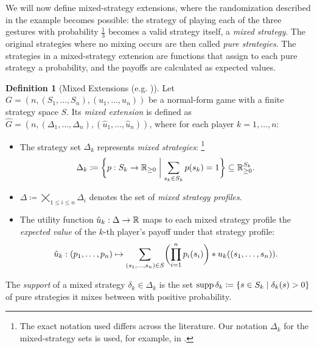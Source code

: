 \documentclass[a4paper]{scrreprt}
\newcommand{\Rp}{\mathbb{R}_{\geq 0}}
\theoremstyle{definition}
\newtheorem{defn}[thm]{Definition} %
\begin{document}
    We will now define mixed-strategy extensions, where the randomization described in the example becomes possible: the strategy of playing each of the three gestures with probability $\frac{1}{3}$ becomes a valid strategy itself, a \emph{mixed strategy}. The original strategies where no mixing occurs are then called \emph{pure strategies}. The strategies in a mixed-strategy extension are functions that assign to each pure strategy a probability, and the payoffs are calculated as expected values.

    \begin{defn}[Mixed Extensions (e.g. \cite{bib:matsumotoGameTheory})]
        Let $G = (n{,}(S_1{,\dots,}S_n){, }(u_1{,\dots,}u_n))$ be a normal-form game with a finite strategy space $S$.
        Its \emph{mixed extension} is defined as $\hat{G} = (n, (\Delta_1, \dots, \Delta_n), (\hat{u}_1, \dots, \hat{u}_n))$,
        where for each player $k = 1,\dots,n$:
        \begin{itemize}
            \item 
            The strategy set $\Delta_k$ represents \emph{mixed strategies}:
            \footnote{The exact notation used differs across the literature. Our notation $\Delta_k$ for the mixed-strategy sets is used, for example, in \cite{bib:quantPropernessProtectiveness}.}
            \begin{gather*} 
                \Delta_k \coloneqq \biggset{ p : S_k \to \Rp \biggmid \sum_{s_k \in S_k} p(s_k) = 1 } \subseteq \Rp^{S_k}.
            \end{gather*} 
            
            \item $\Delta \coloneqq \bigtimes\limits_{1\leq i \leq n} \Delta_i$ denotes the set of \emph{mixed strategy profiles}.
            
            \item
            The utility function $\hat{u}_k: \Delta \to \mathbb{R}$ maps to each mixed strategy profile the \emph{expected value} of the $k$-th player's payoff under that strategy profile:
            \begin{gather}
                \hat{u}_k: 
                (p_1, \dots, p_n) 
                \mapsto
                \sum_{(s_1, \dots, s_n) \in S} \biggl(\prod_{i=1}^{n} p_i(s_i)\biggr) * u_k( (s_1, \dots, s_n) ).
                \label{eq:mixedStrategyUtility}
            \end{gather}
        \end{itemize}
        The \emph{support} of a mixed strategy $\delta_k \in \Delta_k$  is the set $\operatorname{supp} \delta_k \coloneqq \{s \in S_k \mid \delta_k(s) > 0\}$ of pure strategies it mixes between with positive probability.
    \end{defn}
\end{document}
